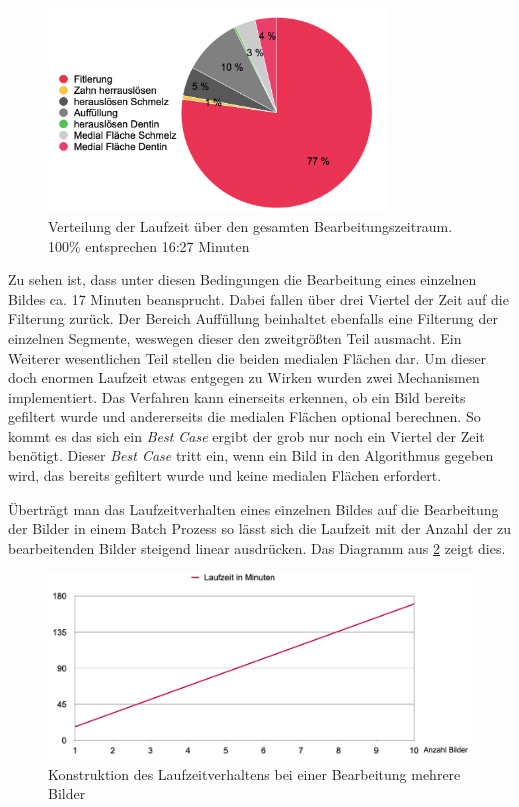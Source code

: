 \begin{figure}[h]
	\centering
	\includegraphics[width=0.8\textwidth]{img/laufzeit_diagramm.png}
	\caption{Verteilung der Laufzeit über den gesamten Bearbeitungszeitraum. 100\%
	entsprechen 16:27 Minuten}
	\label{fig:laufzeit}
\end{figure}

Zu sehen ist, dass unter diesen Bedingungen die Bearbeitung eines einzelnen
Bildes ca. 17 Minuten beansprucht. Dabei fallen über drei Viertel der Zeit auf
die Filterung zurück. Der Bereich Auffüllung beinhaltet ebenfalls eine Filterung
der einzelnen Segmente, weswegen dieser den zweitgrößten Teil ausmacht. Ein Weiterer
wesentlichen Teil stellen die beiden medialen Flächen dar. Um dieser doch
enormen Laufzeit etwas entgegen zu Wirken wurden zwei Mechanismen implementiert.
Das Verfahren kann einerseits erkennen, ob ein Bild bereits gefiltert wurde und
andererseits die medialen Flächen optional berechnen. So kommt es das sich ein \textit{Best
Case} ergibt der grob nur noch ein Viertel der Zeit benötigt. Dieser \textit{Best
Case} tritt ein, wenn ein Bild in den Algorithmus gegeben wird, das bereits
gefiltert wurde und keine medialen Flächen erfordert.

Überträgt man das Laufzeitverhalten eines einzelnen Bildes auf die Bearbeitung
der Bilder in einem Batch Prozess so lässt sich die Laufzeit mit der Anzahl der
zu bearbeitenden Bilder steigend linear ausdrücken. Das Diagramm aus \ref{fig:laufzeit_batch}
zeigt dies.

\begin{figure}[h]
	\centering
	\includegraphics[width=1\textwidth]{img/runtimeBatch.png}
	\caption{Konstruktion des Laufzeitverhaltens bei einer Bearbeitung mehrere
	Bilder}
	\label{fig:laufzeit_batch}
\end{figure}

